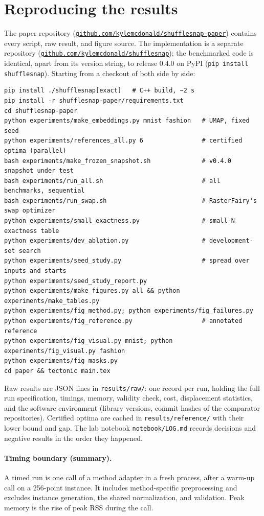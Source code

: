 \section{Reproducing the results}
\label{app:repro}

The paper repository (\href{https://github.com/kylemcdonald/shufflesnap-paper}{\nolinkurl{github.com/kylemcdonald/shufflesnap-paper}}) contains every script, raw result, and figure
source. The implementation is a separate repository (\href{https://github.com/kylemcdonald/shufflesnap}{\nolinkurl{github.com/kylemcdonald/shufflesnap}}); the benchmarked code is
identical, apart from its version string, to release 0.4.0 on PyPI
(\texttt{pip install shufflesnap}). Starting from a checkout of both side by side:
{\small
\begin{verbatim}
pip install ./shufflesnap[exact]   # C++ build, ~2 s
pip install -r shufflesnap-paper/requirements.txt
cd shufflesnap-paper
python experiments/make_embeddings.py mnist fashion   # UMAP, fixed seed
python experiments/references_all.py 6                # certified optima (parallel)
bash experiments/make_frozen_snapshot.sh              # v0.4.0 snapshot under test
bash experiments/run_all.sh                           # all benchmarks, sequential
bash experiments/run_swap.sh                          # RasterFairy's swap optimizer
python experiments/small_exactness.py                 # small-N exactness table
python experiments/dev_ablation.py                    # development-set search
python experiments/seed_study.py                      # spread over inputs and starts
python experiments/seed_study_report.py
python experiments/make_figures.py all && python experiments/make_tables.py
python experiments/fig_method.py; python experiments/fig_failures.py
python experiments/fig_reference.py                   # annotated reference
python experiments/fig_visual.py mnist; python experiments/fig_visual.py fashion
python experiments/fig_masks.py
cd paper && tectonic main.tex
\end{verbatim}
}
Raw results are JSON lines in \texttt{results/raw/}: one record per run, holding the
full run specification, timings, memory, validity check, cost, displacement statistics,
and the software environment (library versions, commit hashes of the comparator
repositories). Certified optima are cached in \texttt{results/reference/} with their
lower bound and gap. The lab notebook \texttt{notebook/LOG.md} records decisions and
negative results in the order they happened.

\paragraph{Timing boundary (summary).} A timed run is one call of a method adapter in a fresh
process, after a warm-up call on a 256-point instance. It includes method-specific
preprocessing and excludes instance generation, the shared normalization, and
validation. Peak memory is the rise of peak RSS during the call.

